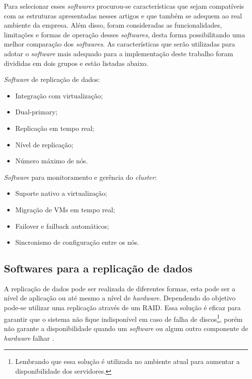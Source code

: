 Para selecionar esses \textit{softwares} procurou-se características que sejam compatíveis com as estruturas apresentadas nesses artigos e que 
também se adequem ao real ambiente da empresa. Além disso, foram consideradas as funcionalidades, limitações e formas de operação desses 
\textit{softwares}, desta forma possibilitando uma melhor comparação dos \textit{softwares}.
As características que serão utilizadas para adotar o \textit{software} mais adequado para a implementação deste trabalho foram divididas em
dois grupos e estão listadas abaixo.

\textit{Software} de replicação de dados:
\begin{itemize}
 \item Integração com virtualização;
 \item Dual-primary;
 \item Replicação em tempo real;
 \item Nível de replicação;
 \item Número máximo de nós.
\end{itemize}

\textit{Software} para monitoramento e gerência do \textit{cluster}:
\begin{itemize}
 \item Suporte nativo a virtualização;
 \item Migração de \acp{VM} em tempo real;
 \item Failover e failback automáticos;
 \item Sincronismo de configuração entre os nós.
\end{itemize}

\subsection{Softwares para a replicação de dados}
\label{section:toolrepl}

A replicação de dados pode ser realizada de diferentes formas, esta pode ser a nível de aplicação ou até mesmo a nível de \textit{hardware}.
Dependendo do objetivo pode-se utilizar uma replicação através de um \ac{RAID}. Essa solução é eficaz para garantir 
que o sistema não fique indisponível em caso de falha de discos\footnote[1]{Lembrando que essa solução é utilizada no ambiente atual para 
aumentar a disponibilidade dos servidores.}, porém não garante a disponibilidade quando um \textit{software} ou algum outro componente de 
\textit{hardware} falhar \cite{zaminhani2008}.

